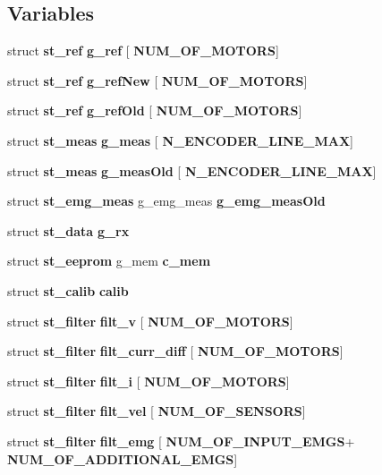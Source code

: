 \subsection*{Variables}
\begin{DoxyCompactItemize}
\item 
\mbox{\label{globals_8c_a975e5cde4f157d8bbdbde3c03227f3de}} 
struct \textbf{ st\+\_\+ref} {\bfseries g\+\_\+ref} [\textbf{ N\+U\+M\+\_\+\+O\+F\+\_\+\+M\+O\+T\+O\+RS}]
\item 
\mbox{\label{globals_8c_ab40c607c340b011a96046994f4b2229c}} 
struct \textbf{ st\+\_\+ref} {\bfseries g\+\_\+ref\+New} [\textbf{ N\+U\+M\+\_\+\+O\+F\+\_\+\+M\+O\+T\+O\+RS}]
\item 
struct \textbf{ st\+\_\+ref} \textbf{ g\+\_\+ref\+Old} [\textbf{ N\+U\+M\+\_\+\+O\+F\+\_\+\+M\+O\+T\+O\+RS}]
\item 
\mbox{\label{globals_8c_a6f0c00c1300c30d398231d1e76f3f780}} 
struct \textbf{ st\+\_\+meas} {\bfseries g\+\_\+meas} [\textbf{ N\+\_\+\+E\+N\+C\+O\+D\+E\+R\+\_\+\+L\+I\+N\+E\+\_\+\+M\+AX}]
\item 
struct \textbf{ st\+\_\+meas} \textbf{ g\+\_\+meas\+Old} [\textbf{ N\+\_\+\+E\+N\+C\+O\+D\+E\+R\+\_\+\+L\+I\+N\+E\+\_\+\+M\+AX}]
\item 
struct \textbf{ st\+\_\+emg\+\_\+meas} g\+\_\+emg\+\_\+meas \textbf{ g\+\_\+emg\+\_\+meas\+Old}
\item 
struct \textbf{ st\+\_\+data} \textbf{ g\+\_\+rx}
\item 
struct \textbf{ st\+\_\+eeprom} g\+\_\+mem \textbf{ c\+\_\+mem}
\item 
struct \textbf{ st\+\_\+calib} \textbf{ calib}
\item 
\mbox{\label{globals_8c_a0e9a576515332f8bd83ae6a2fe0164aa}} 
struct \textbf{ st\+\_\+filter} {\bfseries filt\+\_\+v} [\textbf{ N\+U\+M\+\_\+\+O\+F\+\_\+\+M\+O\+T\+O\+RS}]
\item 
\mbox{\label{globals_8c_a503852d956ef1e03f4a9d8b91db248fc}} 
struct \textbf{ st\+\_\+filter} {\bfseries filt\+\_\+curr\+\_\+diff} [\textbf{ N\+U\+M\+\_\+\+O\+F\+\_\+\+M\+O\+T\+O\+RS}]
\item 
struct \textbf{ st\+\_\+filter} \textbf{ filt\+\_\+i} [\textbf{ N\+U\+M\+\_\+\+O\+F\+\_\+\+M\+O\+T\+O\+RS}]
\item 
struct \textbf{ st\+\_\+filter} \textbf{ filt\+\_\+vel} [\textbf{ N\+U\+M\+\_\+\+O\+F\+\_\+\+S\+E\+N\+S\+O\+RS}]
\item 
struct \textbf{ st\+\_\+filter} \textbf{ filt\+\_\+emg} [\textbf{ N\+U\+M\+\_\+\+O\+F\+\_\+\+I\+N\+P\+U\+T\+\_\+\+E\+M\+GS}+\textbf{ N\+U\+M\+\_\+\+O\+F\+\_\+\+A\+D\+D\+I\+T\+I\+O\+N\+A\+L\+\_\+\+E\+M\+GS}]

\end{DoxyCompactItemize}
